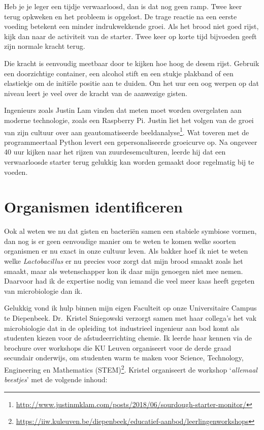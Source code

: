 \documentclass[
  11pt,
  dutch,
]{memoir}
\begin{document}
Heb je je leger een tijdje verwaarloosd, dan is dat nog geen ramp. Twee
keer terug opkweken en het probleem is opgelost. De trage reactie na een
eerste voeding betekent een minder indrukwekkende groei. Als het brood
niet goed rijst, kijk dan naar de activiteit van de starter. Twee keer
op korte tijd bijvoeden geeft zijn normale kracht terug.

Die kracht is eenvoudig meetbaar door te kijken hoe hoog de desem rijst.
Gebruik een doorzichtige container, een alcohol stift en een stukje
plakband of een elastiekje om de initiële positie aan te duiden. Om het
uur een oog werpen op dat niveau leert je veel over de kracht van de
aanwezige gisten.

Ingenieurs zoals Justin Lam vinden dat meten moet worden overgelaten aan
moderne technologie, zoals een Raspberry Pi. Justin liet het volgen van
de groei van zijn cultuur over aan geautomatiseerde
beeldanalyse\footnote{\url{http://www.justinmklam.com/posts/2018/06/sourdough-starter-monitor/}}.
Wat toveren met de programmeertaal Python levert een gepersonaliseerde
groeicurve op. Na ongeveer 40 uur kijken naar het rijzen van
zuurdesemculturen, leerde hij dat een verwaarloosde starter terug
gelukkig kan worden gemaakt door regelmatig bij te voeden.

\hypertarget{organismen-identificeren}{%
\section{Organismen identificeren}\label{organismen-identificeren}}

Ook al weten we nu dat gisten en bacteriën samen een stabiele symbiose
vormen, dan nog is er geen eenvoudige manier om te weten te komen welke
soorten organismen er nu exact in onze cultuur leven. Als bakker hoef ik
niet te weten welke \emph{Lactobacillus} er nu precies voor zorgt dat
mijn brood smaakt zoals het smaakt, maar als wetenschapper kon ik daar
mijn genoegen niet mee nemen. Daarvoor had ik de expertise nodig van
iemand die veel meer kaas heeft gegeten van microbiologie dan ik.

Gelukkig vond ik hulp binnen mijn eigen Faculteit op onze Universitaire
Campus te Diepenbeek. Dr.~Kristel Sniegowski verzorgt samen met haar
collega's het vak microbiologie dat in de opleiding tot industrieel
ingenieur aan bod komt als studenten kiezen voor de afstudeerrichting
chemie. Ik leerde haar kennen via de brochure over workshops die KU
Leuven organiseert voor de derde graad secundair onderwijs, om studenten
warm te maken voor Science, Technology, Engineering en Mathematics
(STEM)\footnote{\url{https://iiw.kuleuven.be/diepenbeek/educatief-aanbod/leerlingenworkshops}}.
Kristel organiseert de workshop `\emph{allemaal beestjes}' met de
volgende inhoud:
\end{document}

